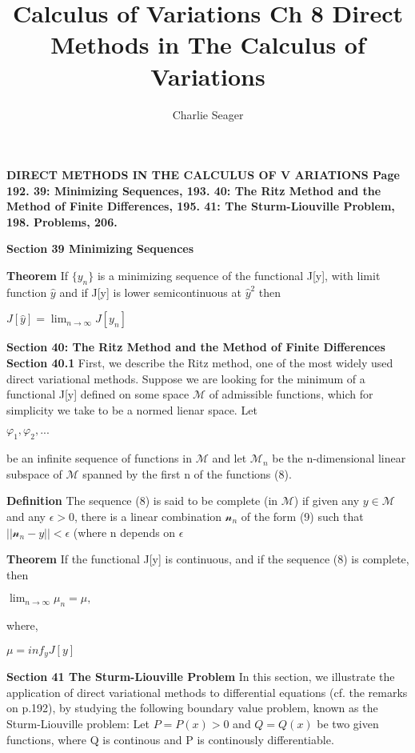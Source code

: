 \documentclass{article}
\begin{document}
\title {Calculus of Variations Ch 8 Direct Methods in The Calculus of Variations}

\author{Charlie Seager}

\maketitle

\textbf{DIRECT METHODS IN THE CALCULUS OF V ARIATIONS Page 192. 39: Minimizing Sequences, 193. 40: The Ritz Method and the Method of Finite Differences, 195. 41: The Sturm-Liouville Problem, 198. Problems, 206.}

\textbf {Section 39 Minimizing Sequences}

\textbf {Theorem} If $\{y_n\}$ is a minimizing sequence of the functional J[y], with limit function $\hat{y}$ and if J[y] is lower semicontinuous at $\hat{y}^2$ then
\begin{center}
$J[\hat{y}] = \lim_{n \to \infty} J[y_n]$
\end{center}

\textbf {Section 40: The Ritz Method and the Method of Finite Differences}
\textbf {Section 40.1} First, we describe the Ritz method, one of the most widely used direct variational methods. Suppose we are looking for the minimum of a functional J[y] defined on some space $\mathcal{M}$ of admissible functions, which for simplicity we take to be a normed lienar space. Let
\begin{center}
$\varphi_1 , \varphi_2 ,...$
\end{center} 
be an infinite sequence of functions in $\mathcal{M}$ and let $\mathcal{M}_n$ be the n-dimensional linear subspace of $\mathcal{M}$ spanned by the first n of the functions (8).

\textbf {Definition} The sequence (8) is said to be complete (in $\mathcal{M}$) if given any $y \in \mathcal{M}$ and any $\epsilon > 0$, there is a linear combination $\mathcal{n}_n$ of the form (9) such that $||\mathcal{n}_n - y|| < \epsilon$ (where n depends on $\epsilon$

\textbf {Theorem} If the functional J[y] is continuous, and if the sequence (8) is complete, then
\begin{center}
$\lim_{n \to \infty} \mu_n = \mu,$
\end{center}
where, 
\begin{center}
$\mu = inf_y J[y]$
\end{center}

\textbf {Section 41 The Sturm-Liouville Problem} In this section, we illustrate the application of direct variational methods to differential equations (cf. the remarks on p.192), by studying the following boundary value problem, known as the Sturm-Liouville problem: Let $P = P(x) > 0$ and $Q = Q(x)$ be two given functions, where Q is continous and P is continously differentiable.
\end{document}
